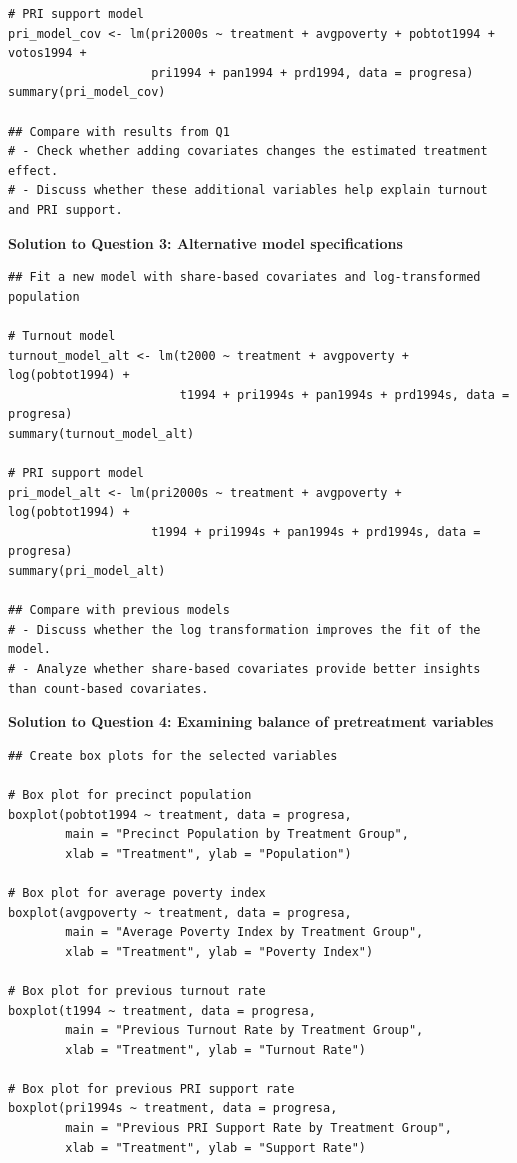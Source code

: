 \documentclass[12pt]{article}
\begin{document}
{\begin{verbatim}
# PRI support model
pri_model_cov <- lm(pri2000s ~ treatment + avgpoverty + pobtot1994 + votos1994 + 
                    pri1994 + pan1994 + prd1994, data = progresa)
summary(pri_model_cov)

## Compare with results from Q1
# - Check whether adding covariates changes the estimated treatment effect.
# - Discuss whether these additional variables help explain turnout and PRI support.
\end{verbatim}

\textbf{Solution to Question 3: Alternative model specifications}

\begin{verbatim}
## Fit a new model with share-based covariates and log-transformed population

# Turnout model
turnout_model_alt <- lm(t2000 ~ treatment + avgpoverty + log(pobtot1994) + 
                        t1994 + pri1994s + pan1994s + prd1994s, data = progresa)
summary(turnout_model_alt)

# PRI support model
pri_model_alt <- lm(pri2000s ~ treatment + avgpoverty + log(pobtot1994) + 
                    t1994 + pri1994s + pan1994s + prd1994s, data = progresa)
summary(pri_model_alt)

## Compare with previous models
# - Discuss whether the log transformation improves the fit of the model.
# - Analyze whether share-based covariates provide better insights than count-based covariates.
\end{verbatim}

\textbf{Solution to Question 4: Examining balance of pretreatment variables}

\begin{verbatim}
## Create box plots for the selected variables

# Box plot for precinct population
boxplot(pobtot1994 ~ treatment, data = progresa,
        main = "Precinct Population by Treatment Group",
        xlab = "Treatment", ylab = "Population")

# Box plot for average poverty index
boxplot(avgpoverty ~ treatment, data = progresa,
        main = "Average Poverty Index by Treatment Group",
        xlab = "Treatment", ylab = "Poverty Index")

# Box plot for previous turnout rate
boxplot(t1994 ~ treatment, data = progresa,
        main = "Previous Turnout Rate by Treatment Group",
        xlab = "Treatment", ylab = "Turnout Rate")

# Box plot for previous PRI support rate
boxplot(pri1994s ~ treatment, data = progresa,
        main = "Previous PRI Support Rate by Treatment Group",
        xlab = "Treatment", ylab = "Support Rate")


\end{verbatim}}
\end{document}
